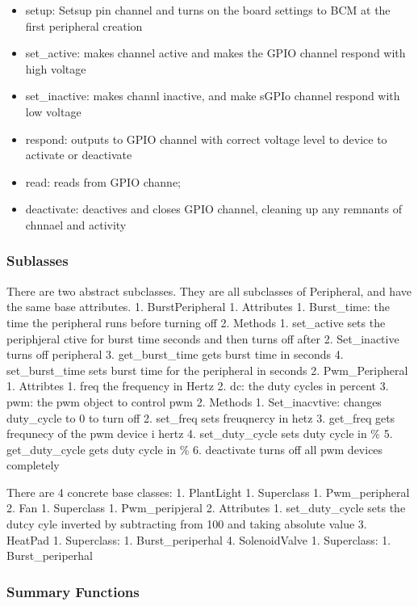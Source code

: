 \documentclass[
]{article}
\providecommand{\tightlist}{%
  \setlength{\itemsep}{0pt}\setlength{\parskip}{0pt}}
\begin{document}
\begin{itemize}
\tightlist
\item
  setup: Setsup pin channel and turns on the board settings to BCM at
  the first peripheral creation
\item
  set\_active: makes channel active and makes the GPIO channel respond
  with high voltage
\item
  set\_inactive: makes channl inactive, and make sGPIo channel respond
  with low voltage
\item
  respond: outputs to GPIO channel with correct voltage level to device
  to activate or deactivate
\item
  read: reads from GPIO channe;
\item
  deactivate: deactives and closes GPIO channel, cleaning up any
  remnants of chnnael and activity
\end{itemize}

\hypertarget{sublasses}{%
\subsubsection{Sublasses}\label{sublasses}}

There are two abstract subclasses. They are all subclasses of
Peripheral, and have the same base attributes. 1. BurstPeripheral 1.
Attributes 1. Burst\_time: the time the peripheral runs before turning
off 2. Methods 1. set\_active sets the periphjeral ctive for burst time
seconds and then turns off after 2. Set\_inactive turns off peripheral
3. get\_burst\_time gets burst time in seconds 4. set\_burst\_time sets
burst time for the peripheral in seconds 2. Pwm\_Peripheral 1. Attribtes
1. freq the frequency in Hertz 2. dc: the duty cycles in percent 3. pwm:
the pwm object to control pwm 2. Methods 1. Set\_inacvtive: changes
duty\_cycle to 0 to turn off 2. set\_freq sets freuqnercy in hetz 3.
get\_freq gets frequnecy of the pwm device i hertz 4. set\_duty\_cycle
sets duty cycle in \% 5. get\_duty\_cycle gets duty cycle in \% 6.
deactivate turns off all pwm devices completely

There are 4 concrete base classes: 1. PlantLight 1. Superclass 1.
Pwm\_peripheral 2. Fan 1. Superclass 1. Pwm\_peripjeral 2. Attributes 1.
set\_duty\_cycle sets the dutcy cyle inverted by subtracting from 100
and taking absolute value 3. HeatPad 1. Superclass: 1. Burst\_periperhal
4. SolenoidValve 1. Superclass: 1. Burst\_periperhal

\hypertarget{summary-functions-1}{%
\subsubsection{Summary Functions}\label{summary-functions-1}}
\end{document}
